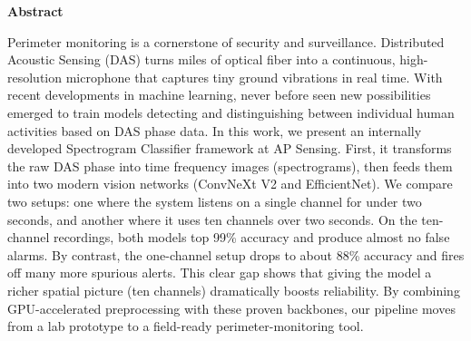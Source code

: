 %
%






\begin{Large}
\textsf{\textbf{Abstract}}\\
\end{Large}


Perimeter monitoring is a cornerstone of security and surveillance. Distributed Acoustic Sensing (DAS) turns miles of optical fiber into a continuous, high-resolution microphone that captures tiny ground vibrations in real time. With recent developments in machine learning, never before seen new possibilities emerged to train models detecting and distinguishing between individual human activities based on DAS phase data. In this work, we present an internally developed Spectrogram Classifier framework at AP Sensing. First, it transforms the raw DAS phase into  time frequency images (spectrograms), then feeds them into two modern vision networks (ConvNeXt V2 and EfficientNet). We compare two setups: one where the system listens on a single channel for under two seconds, and another where it uses ten channels over two seconds. On the ten-channel recordings, both models top 99\% accuracy and produce almost no false alarms. By contrast, the one-channel setup drops to about 88\% accuracy and fires off many more spurious alerts. This clear gap shows that giving the model a richer spatial picture (ten channels) dramatically boosts reliability. By combining GPU-accelerated preprocessing with these proven backbones, our pipeline moves from a lab prototype to a field-ready perimeter-monitoring tool.



